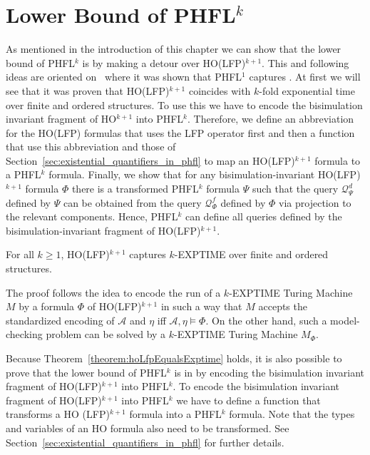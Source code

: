 
\section{Lower Bound of PHFL$^k$}\label{sec:lowerBoundOfPhfl}

As mentioned in the introduction of this chapter we can show that the lower bound of PHFL$^k$ is  by
making a detour over HO(LFP)$^{k+1}$. This and following ideas are oriented on~\cite{lange2014capturing} where it was
shown that PHFL$^1$ captures . At first we will see that it was proven that HO(LFP)$^{k +
1}$ coincides with $k$-fold exponential time over finite and ordered structures. To use this we have to encode the
bisimulation invariant fragment of HO$^{k+1}$ into PHFL$^k$. Therefore, we define an abbreviation for the HO(LFP)
formulas that uses the LFP operator first and then a function that use this abbreviation and those of
Section~\ref{sec:existential_quantifiers_in_phfl} to map an HO(LFP)$^{k+1}$ formula to a PHFL$^k$ formula. Finally, we
show that for any bisimulation-invariant HO(LFP)$^{k+1}$ formula $\Phi$ there is a transformed PHFL$^k$ formula $\Psi$ such that the query $\mathcal{Q}^d_\Psi$ defined by $\Psi$ can be obtained from the query $\mathcal{Q}^f_\Phi$ defined by $\Phi$ via projection to the relevant components. Hence, PHFL$^k$ can define all queries defined by the bisimulation-invariant fragment of HO(LFP)$^{k+1}$.

\begin{theorem}{\cite{freireMartins2011descriptive}}\label{theorem:hoLfpEqualsExptime}
    For all $k \geq 1$, HO(LFP)$^{k + 1}$ captures $k$-EXPTIME over finite and ordered structures.
\end{theorem}

The proof follows the idea to encode the run of a $k$-EXPTIME Turing Machine $M$ by a formula $\Phi$ of HO(LFP)$^{k +
1}$ in such a way that $M$ accepts the standardized encoding of $\mathcal{A}$ and $\eta$ iff $\mathcal{A}, \eta \models \Phi$. On the other hand, such a model-checking problem can be solved by a $k$-EXPTIME Turing Machine $M_\Phi$.

Because Theorem~\ref{theorem:hoLfpEqualsExptime} holds, it is also possible to prove that the lower bound of PHFL$^k$
is in  by encoding the bisimulation invariant fragment of HO(LFP)$^{k + 1}$ into PHFL$^k$. To encode the
bisimulation invariant fragment of HO(LFP)$^{k + 1}$ into PHFL$^k$ we have to define a function that transforms a HO
(LFP)$^{k + 1}$ formula into a PHFL$^k$ formula. Note that the types and variables of an HO formula also need to be
transformed. See Section~\ref{sec:existential_quantifiers_in_phfl} for further details.

